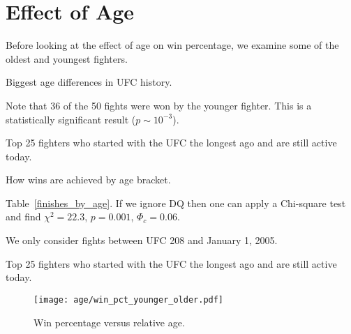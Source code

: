 \clearpage
\section*{Effect of Age}

Before looking at the effect of age on win percentage, we examine
some of the oldest and youngest fighters.

\begin{center}
\begin{table}[h]

\caption{Biggest age differences in UFC history.}
\label{biggest_age_diff}
\end{table}
\end{center}

Note that 36 of the 50 fights were won by the younger
fighter. This is a statistically
significant result ($p\sim 10^{-3}$).

\begin{center}
\begin{table}[h]

\caption{Top 25 fighters who started with the UFC the longest ago and are still active today.}
\end{table}
\end{center}

\begin{center}
\begin{table}[h]

\caption{How wins are achieved by age bracket.}
\label{finishes_by_age}
\end{table}
\end{center}

Table~\ref{finishes_by_age}. If we ignore DQ then
one can apply a Chi-square test and find
$\chi^2=22.3$, $p=0.001$, $\Phi_c=0.06$.

We only consider fights between UFC 208 and January 1, 2005.

\begin{center}
\begin{table}[h]

\caption{Top 25 fighters who started with the UFC the longest ago and are still active today.}
\end{table}
\end{center}

\clearpage

\begin{figure}[h]
\begin{center}
\texttt{[image: age/win\_pct\_younger\_older.pdf]}
\caption{Win percentage versus relative age.}
\label{win_pct_younger_older}
\end{center}
\end{figure}


